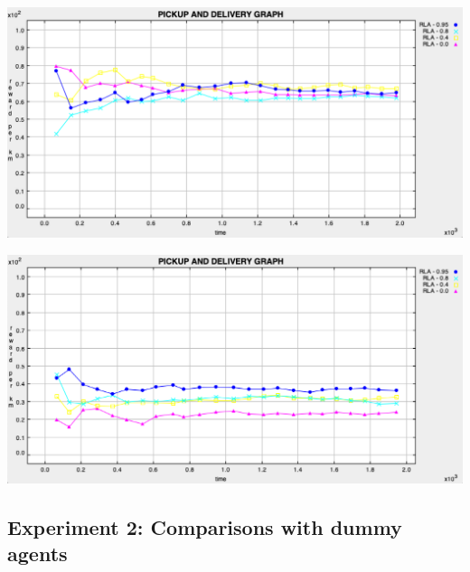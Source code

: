 \documentclass[11pt]{article}
\begin{document}
\begin{minipage}[]{\textwidth}

\begin{minipage}[]{0.45\textwidth}
\includegraphics[width=\textwidth]{2-reactive/doc/plots/2000ticks-cost5.png}
\label{fig:cost5}
\end{minipage}
\hfill
\begin{minipage}[]{0.45\textwidth}
\includegraphics[width=\textwidth]{2-reactive/doc/plots/2000ticks-cost50.png}
\label{fig:cost50}
\end{minipage}
\hfill

\end{minipage}



\subsection{Experiment 2: Comparisons with dummy agents}
\end{document}
